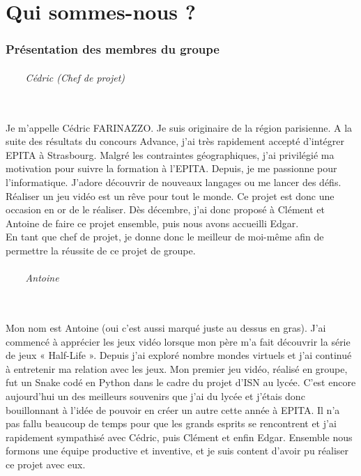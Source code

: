 \documentclass[titlepage, 13px, a4paper]{report}
\begin{document}


\newpage


\part{Qui sommes-nous ?}
\section{Présentation des membres du groupe}

\paragraph{~~~~Cédric (Chef de projet)} \hspace{0pt} \\
Je m’appelle Cédric FARINAZZO. Je suis originaire de la région parisienne. 
A la suite des résultats du concours Advance, j'ai très rapidement accepté d'intégrer EPITA à Strasbourg. 
Malgré les contraintes géographiques, j'ai privilégié ma motivation pour suivre la formation à l'EPITA. 
Depuis, je me passionne pour l’informatique. J’adore découvrir de nouveaux langages ou me lancer des défis. \\
Réaliser un jeu vidéo est un rêve pour tout le monde. Ce projet est donc une occasion en or de le réaliser. 
Dès décembre, j’ai donc proposé à Clément et Antoine de faire ce projet ensemble, puis nous avons accueilli Edgar. \\
En tant que chef de projet, je donne donc le meilleur de moi-même afin de permettre la réussite de ce projet de groupe. \\


\paragraph{~~~~Antoine} \hspace{0pt} \\
Mon nom est Antoine (oui c'est aussi marqué juste au dessus en gras). 
J'ai commencé à apprécier les jeux vidéo lorsque mon père m'a fait découvrir la 
série de jeux « Half-Life ». Depuis j'ai exploré nombre mondes virtuels et j'ai 
continué à entretenir ma relation avec les jeux. Mon premier jeu vidéo, réalisé en 
groupe, fut un Snake codé en Python dans le cadre du projet d'ISN au lycée. C'est 
encore aujourd'hui un des meilleurs souvenirs que j'ai du lycée et j'étais donc bouillonnant 
à l'idée de pouvoir en créer un autre cette année à EPITA. Il n'a pas fallu beaucoup 
de temps pour que les grands esprits se rencontrent et j'ai rapidement sympathisé avec 
Cédric, puis Clément et enfin Edgar. Ensemble nous formons une équipe productive et 
inventive, et je suis content d'avoir pu réaliser ce projet avec eux. \\
\end{document}
